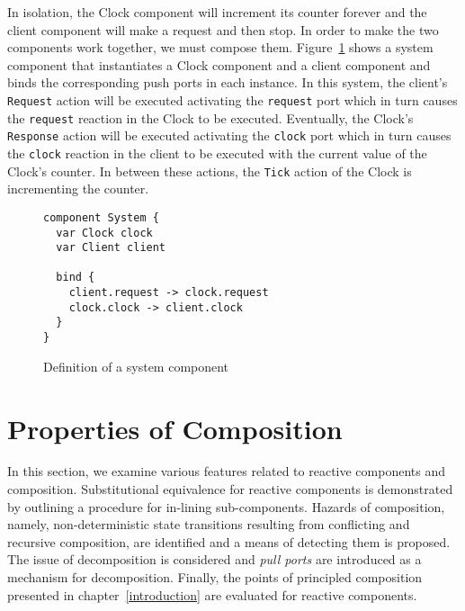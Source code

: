 In isolation, the Clock component will increment its counter forever and the client component will make a request and then stop.
In order to make the two components work together, we must compose them.
Figure~\ref{system_component} shows a system component that instantiates a Clock component and a client component and binds the corresponding push ports in each instance.
In this system, the client's \verb+Request+ action will be executed activating the \verb+request+ port which in turn causes the \verb+request+ reaction in the Clock to be executed.
Eventually, the Clock's \verb+Response+ action will be executed activating the \verb+clock+ port which in turn causes the \verb+clock+ reaction in the client to be executed with the current value of the Clock's counter.
In between these actions, the \verb+Tick+ action of the Clock is incrementing the counter.

\begin{figure}
\begin{verbatim}
component System {
  var Clock clock
  var Client client

  bind {
    client.request -> clock.request
    clock.clock -> client.clock
  }
}
\end{verbatim}
\caption{Definition of a system component\label{system_component}}
\end{figure}

\section{Properties of Composition\label{compprops}}
In this section, we examine various features related to reactive components and composition.
Substitutional equivalence for reactive components is demonstrated by outlining a procedure for in-lining sub-components.
Hazards of composition, namely, non-deterministic state transitions resulting from conflicting and recursive composition, are identified and a means of detecting them is proposed.
The issue of decomposition is considered and \emph{pull ports} are introduced as a mechanism for decomposition.
Finally, the points of principled composition presented in chapter~\ref{introduction} are evaluated for reactive components.


